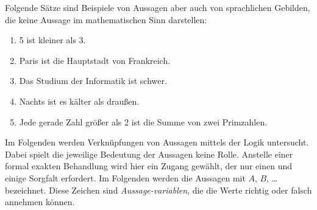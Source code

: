 \begin{example}
Folgende Sätze sind Beispiele von Aussagen aber auch von sprachlichen Gebilden, die keine Aussage im mathematischen Sinn darstellen:
\begin{enumerate}
\item 5 ist kleiner als 3.
\item Paris ist die Hauptstadt von Frankreich.
\item Das Studium der Informatik ist schwer.
\item Nachts ist es kälter als draußen.
\item Jede gerade Zahl größer als 2 ist die Summe von zwei Primzahlen.
\end{enumerate}
\end{example}

Im Folgenden werden Verknüpfungen von Aussagen mittels der Logik untersucht. Dabei spielt die jeweilige Bedeutung der Aussagen keine Rolle. Anstelle einer formal exakten Behandlung wird hier ein  Zugang gewählt, der nur einen  und einige Sorgfalt erfordert. Im Folgenden werden die Aussagen mit $A$, $B$, \dots bezeichnet. Diese Zeichen sind \emph{Aussage-variablen}, die die Werte richtig oder falsch annehmen können.

